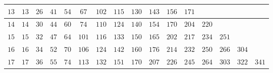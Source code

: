 \begin{center}
{\begin{tabular}{|c!{\vrule width 1.2pt}*{15}{c|}}
\hline
$13$ & $13$ & $26$ & $41$ & $54$ & $67$ & $102$ & $115$ & $130$ & $143$ & $156$ & $171$ &  &  &  &  \\
\hline
$14$ & $14$ & $30$ & $44$ & $60$ & $74$ & $110$ & $124$ & $140$ & $154$ & $170$ & $204$ & $220$ &  &  &  \\
\hline
$15$ & $15$ & $32$ & $47$ & $64$ & $101$ & $116$ & $133$ & $150$ & $165$ & $202$ & $217$ & $234$ & $251$ &  &  \\
\hline
$16$ & $16$ & $34$ & $52$ & $70$ & $106$ & $124$ & $142$ & $160$ & $176$ & $214$ & $232$ & $250$ & $266$ & $304$ &  \\
\hline
$17$ & $17$ & $36$ & $55$ & $74$ & $113$ & $132$ & $151$ & $170$ & $207$ & $226$ & $245$ & $264$ & $303$ & $322$ & $341$ \\
\hline
\end{tabular}%
}
\end{center}
\vspace{1em}

